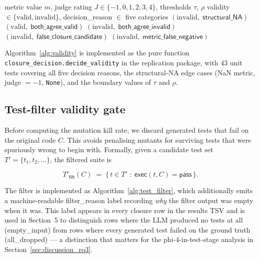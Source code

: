 \begin{algorithm}[h]
\caption{Closure validity decision (implements Eq.~\ref{eq:valid1}--\ref{eq:valid3})}
\label{alg:validity}
\begin{algorithmic}[1]
\Require metric value $m$, judge rating $J \in \{-1, 0, 1, 2, 3, 4\}$, thresholds $\tau$, $\rho$
\Ensure validity $\in \{\text{valid}, \text{invalid}\}$, \textsf{decision\_reason} $\in$ five categories
  \State \Return $(\text{invalid},\; \textsf{structural\_NA})$ 
\EndIf
{}
  \State \Return $(\text{valid},\; \textsf{both\_agree\_valid})$
  \State \Return $(\text{invalid},\; \textsf{both\_agree\_invalid})$
  \State \Return $(\text{invalid},\; \textsf{false\_closure\_candidate})$ 
\Else {}
  \State \Return $(\text{invalid},\; \textsf{metric\_false\_negative})$ 
\EndIf
\end{algorithmic}
\end{algorithm}

Algorithm~\ref{alg:validity} is implemented as the pure function \texttt{closure\_decision.decide\_validity} in the replication package, with 43 unit tests covering all five decision reasons, the structural-NA edge cases (NaN metric, judge $= -1$, \texttt{None}), and the boundary values of $\tau$ and $\rho$.

\subsection{Test-filter validity gate}

Before computing the mutation kill rate, we discard generated tests that fail on the original code $C$. This avoids penalising mutants for surviving tests that were spuriously wrong to begin with. Formally, given a candidate test set $T' = \{t_1, t_2, \ldots\}$, the filtered suite is

\begin{equation}
  T'_{\textsf{filt}}(C)
  \;=\;
  \bigl\{\, t \in T' \;:\; \textsf{exec}(t, C) = \textsf{pass} \,\bigr\}.
  \label{eq:filter}
\end{equation}

The filter is implemented as Algorithm~\ref{alg:test_filter}, which additionally emits a machine-readable \textsf{filter\_reason} label recording \emph{why} the filter output was empty when it was. This label appears in every closure row in the results TSV and is used in Section~5 to distinguish rows where the LLM produced no tests at all (\textsf{empty\_input}) from rows where every generated test failed on the ground truth (\textsf{all\_dropped}) --- a distinction that matters for the phi-4-in-test-stage analysis in Section~\ref{sec:discussion_rq3}.

